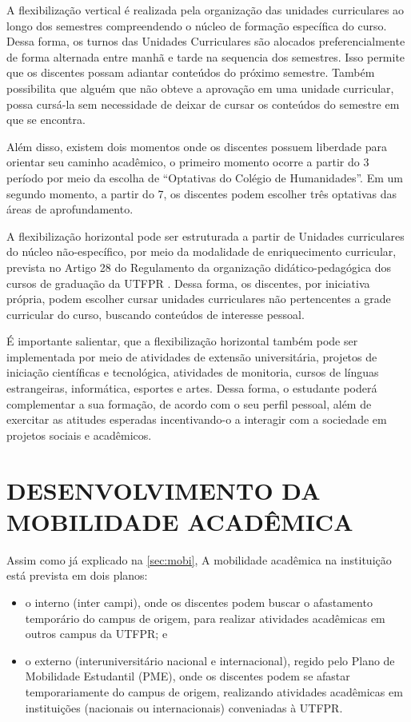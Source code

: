 A flexibilização vertical é realizada pela organização das unidades curriculares ao longo dos semestres compreendendo o núcleo de formação específica do curso. Dessa forma, os turnos das Unidades Curriculares são alocados preferencialmente de forma alternada entre manhã e tarde na sequencia dos semestres. Isso permite que os discentes possam adiantar conteúdos do próximo semestre. Também possibilita que alguém que não obteve a aprovação em uma unidade curricular, possa cursá-la sem necessidade de deixar de cursar os conteúdos do semestre em que se encontra.

Além disso, existem dois momentos onde os discentes possuem liberdade para orientar seu caminho acadêmico, o primeiro momento ocorre a partir do 3\textordmasculine{} período por meio da escolha de ``Optativas do Colégio de Humanidades''. Em um segundo momento, a partir do 7\textordmasculine{}, os discentes podem escolher três optativas das áreas de aprofundamento.

A flexibilização horizontal pode ser estruturada a partir de Unidades curriculares do núcleo não-específico, por meio da modalidade de enriquecimento curricular, prevista no Artigo 28 do Regulamento da organização didático-pedagógica dos cursos de graduação da UTFPR \cite{rodp}. Dessa forma, os discentes, por iniciativa própria, podem escolher cursar unidades curriculares não pertencentes a grade curricular do curso, buscando conteúdos de interesse pessoal.

É importante salientar, que a flexibilização horizontal também pode ser implementada por meio de atividades de extensão universitária, projetos de iniciação científicas e tecnológica, atividades de monitoria, cursos de línguas estrangeiras, informática, esportes e artes. Dessa forma, o estudante poderá complementar a sua formação, de acordo com o seu perfil pessoal, além de exercitar as atitudes esperadas incentivando-o a interagir com a sociedade em projetos sociais e acadêmicos.

\section{DESENVOLVIMENTO DA MOBILIDADE ACADÊMICA}

Assim como já explicado na \autoref{sec:mobi}, A mobilidade acadêmica na instituição está prevista em dois planos: 

\begin{itemize}
    \item o interno (inter campi), onde os discentes podem buscar o afastamento temporário do campus de origem, para realizar atividades acadêmicas em outros campus da UTFPR; e
    \item o externo (interuniversitário nacional e internacional), regido pelo Plano de Mobilidade Estudantil (PME), onde os discentes podem se afastar temporariamente do campus de origem, realizando atividades acadêmicas em instituições (nacionais ou internacionais) conveniadas à UTFPR.
\end{itemize}
 
